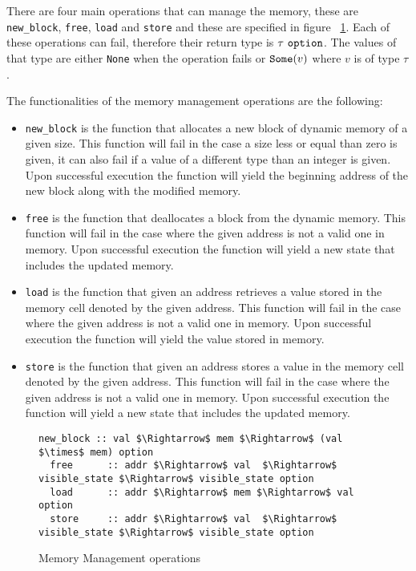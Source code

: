 There are four main operations that can manage the memory, these are \verb|new_block|, \verb|free|, \verb|load| and \verb|store| and these are specified in figure ~\ref{fig:mem_operations}.
Each of these operations can fail, therefore their return type is $\tau\ \verb|option|$.
The values of that type are either \verb|None| when the operation fails or $\verb|Some|(v)$ where $v$ is of type $\tau$.

The functionalities of the memory management operations are the following:

\begin{itemize}
  \item{\verb|new_block| is the function that allocates a new block of dynamic memory of a given size.
  This function will fail in the case a size less or equal than zero is given, it can also fail if a value of a different type than an integer is given.
  Upon successful execution the function will yield the beginning address of the new block along with the modified memory.}
  \item{\verb|free| is the function that deallocates a block from the dynamic memory.
  This function will fail in the case where the given address is not a valid one in memory.
  Upon successful execution the function will yield a new state that includes the updated memory.}
  \item{\verb|load| is the function that given an address retrieves a value stored in the memory cell denoted by the given address.
  This function will fail in the case where the given address is not a valid one in memory.
  Upon successful execution the function will yield the value stored in memory.}
  \item{\verb|store| is the function that given an address stores a value in the memory cell denoted by the given address.
  This function will fail in the case where the given address is not a valid one in memory.
  Upon successful execution the function will yield a new state that includes the updated memory.}
\end{itemize}

\begin{figure}
  \begin{lstlisting}[mathescape=true, frame=single]
  new_block :: val $\Rightarrow$ mem $\Rightarrow$ (val $\times$ mem) option
  free      :: addr $\Rightarrow$ val  $\Rightarrow$ visible_state $\Rightarrow$ visible_state option
  load      :: addr $\Rightarrow$ mem $\Rightarrow$ val option
  store     :: addr $\Rightarrow$ val  $\Rightarrow$ visible_state $\Rightarrow$ visible_state option
  \end{lstlisting}

  \caption{Memory Management operations}
  \label{fig:mem_operations}
\end{figure}

